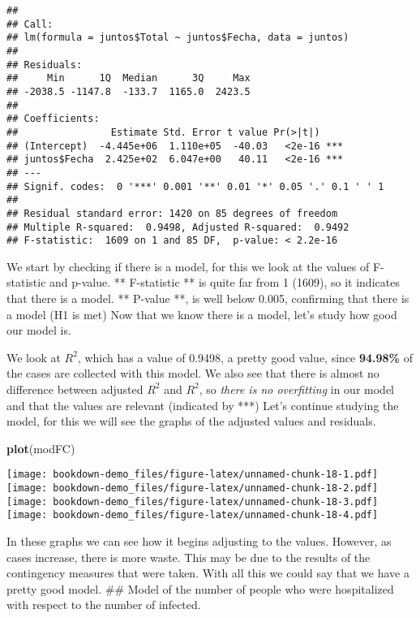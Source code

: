 \documentclass[
]{book}
\newenvironment{Shaded}{\begin{snugshade}}{\end{snugshade}}
\newcommand{\KeywordTok}[1]{\textcolor[rgb]{0.13,0.29,0.53}{\textbf{#1}}}
\newcommand{\NormalTok}[1]{#1}
\begin{document}
\begin{verbatim}
## 
## Call:
## lm(formula = juntos$Total ~ juntos$Fecha, data = juntos)
## 
## Residuals:
##     Min      1Q  Median      3Q     Max 
## -2038.5 -1147.8  -133.7  1165.0  2423.5 
## 
## Coefficients:
##                Estimate Std. Error t value Pr(>|t|)    
## (Intercept)  -4.445e+06  1.110e+05  -40.03   <2e-16 ***
## juntos$Fecha  2.425e+02  6.047e+00   40.11   <2e-16 ***
## ---
## Signif. codes:  0 '***' 0.001 '**' 0.01 '*' 0.05 '.' 0.1 ' ' 1
## 
## Residual standard error: 1420 on 85 degrees of freedom
## Multiple R-squared:  0.9498, Adjusted R-squared:  0.9492 
## F-statistic:  1609 on 1 and 85 DF,  p-value: < 2.2e-16
\end{verbatim}

We start by checking if there is a model, for this we look at the values of F-statistic and p-value.
** F-statistic ** is quite far from 1 (1609), so it indicates that there is a model.
** P-value **, is well below 0.005, confirming that there is a model (H1 is met)
Now that we know there is a model, let's study how good our model is.

We look at \(R^2\), which has a value of 0.9498, a pretty good value, since \textbf{94.98\%} of the cases are collected with this model.
We also see that there is almost no difference between adjusted \(R^2\) and \(R^2\), so \emph{there is no overfitting} in our model and that the values are relevant (indicated by ***)
Let's continue studying the model, for this we will see the graphs of the adjusted values and residuals.

\begin{Shaded}
\begin{Highlighting}[]
\KeywordTok{plot}\NormalTok{(modFC)}
\end{Highlighting}
\end{Shaded}

\texttt{[image: bookdown-demo\_files/figure-latex/unnamed-chunk-18-1.pdf]} \texttt{[image: bookdown-demo\_files/figure-latex/unnamed-chunk-18-2.pdf]} \texttt{[image: bookdown-demo\_files/figure-latex/unnamed-chunk-18-3.pdf]} \texttt{[image: bookdown-demo\_files/figure-latex/unnamed-chunk-18-4.pdf]}

In these graphs we can see how it begins adjusting to the values. However, as cases increase, there is more waste.
This may be due to the results of the contingency measures that were taken.
With all this we could say that we have a pretty good model.
\#\# Model of the number of people who were hospitalized with respect to the number of infected.
\end{document}
